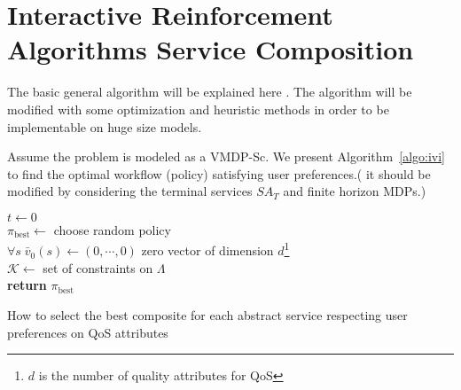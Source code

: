\documentclass{sigchi}
\begin{document}
\section{Interactive Reinforcement Algorithms Service Composition}

{\color{blue} The basic general algorithm will be explained here \cite{weng:hal-00942290}. The algorithm will be modified with some optimization and heuristic methods in order to be implementable on huge size models.}

Assume the problem is modeled as a VMDP-Sc. We present Algorithm~\ref{algo:ivi} to find the optimal workflow (policy) satisfying user preferences.({\color{red} it should be modified by considering the terminal services $SA_T$ and finite horizon MDPs.}) 

\begin{algorithm}[]
 $t \longleftarrow 0$ \\
 $\pi_{\text{best}} \longleftarrow $ choose random policy \\
 $\forall s \; \bar{v}_0(s) \longleftarrow (0, \cdots, 0)$ zero vector of dimension $d$\footnote{$d$ is the number of quality attributes for QoS} \\
 $\mathcal{K} \longleftarrow $ set of constraints on $\Lambda$ \\
 \textbf{return} $\pi_{\text{best}}$ \\
 \vspace{0.3cm}
 \caption{How to select the best composite for each abstract service respecting user preferences on QoS attributes}
\end{algorithm}\label{algo:ivi}
\end{document}
